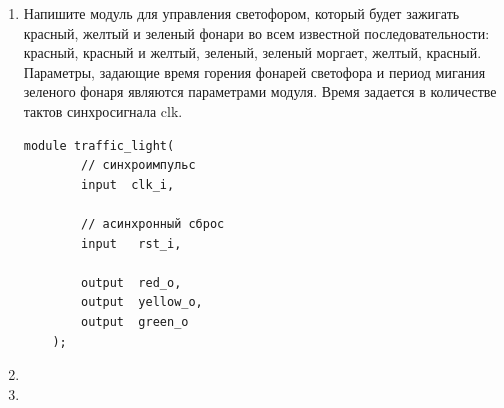 \begin{enumerate}
	\item Напишите модуль для управления светофором, который будет зажигать красный, желтый и зеленый фонари во всем известной последовательности: красный, красный и желтый, зеленый, зеленый моргает, желтый, красный. Параметры, задающие время горения фонарей светофора и период мигания зеленого фонаря являются параметрами модуля. Время задается в количестве тактов синхросигнала clk.
	\begin{Verbatim}[tabsize=4]
	module traffic_light(
		// cинхроимпульс
	  	input  clk_i,
	
	  	// асинхронный сброс
	  	input   rst_i,
	
	  	output  red_o,
	  	output  yellow_o,
	  	output  green_o
	);
	\end{Verbatim}
	\item 
	\item
\end{enumerate}

